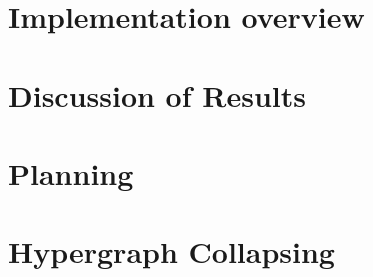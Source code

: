 \documentclass[Master.tex]{subfiles}
\begin{document}
\section{Implementation overview}
    

\section{Discussion of Results}
    

\section{Planning}\label{sec:disc:planning}
    

\section{Hypergraph Collapsing}
    
\end{document}
